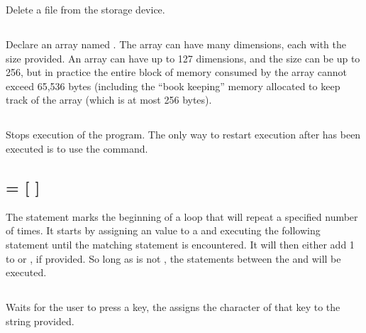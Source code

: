 \documentclass{report}
\begin{document}
    Delete a file from the storage device.

    \subsection*{}

    Declare an array named .
    The array can have many dimensions, each with the size provided.
    An array can have up to 127 dimensions, and the size can be up to 256, but in practice the entire block of memory
    consumed by the array cannot exceed 65,536 bytes (including the ``book keeping'' memory allocated to keep track of the array
    (which is at most 256 bytes).

    \subsection*{}

    Stops execution of the program. The only way to restart execution after  has been
    executed is to use the  command.

    \subsection*{  =    [ ]}

    The  statement marks the beginning of a loop that will repeat a specified number of times.
    It starts by assigning an  value to a  and executing the following statement until
    the matching  statement is encountered. It will then either add 1 to  or
    , if provided. So long as  is not , the statements between the
     and  will be executed.

    \subsection*{ }

    Waits for the user to press a key, the assigns the character of that key to the string  provided.

    \subsection*{ }
\end{document}
